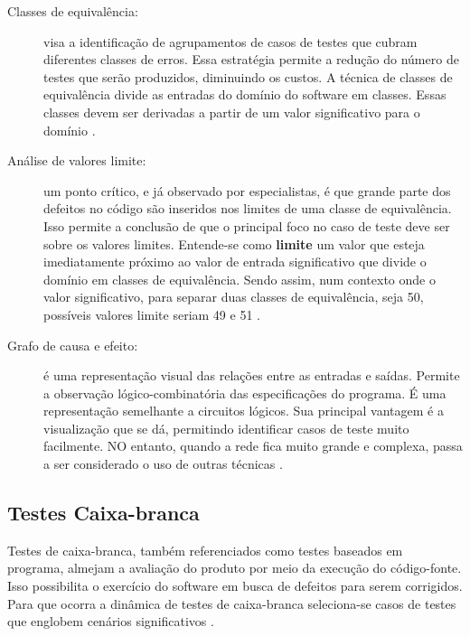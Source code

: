 \begin{description}
\item[Classes de equivalência:] visa a identificação de agrupamentos de casos de testes que cubram diferentes classes de erros. Essa estratégia permite a redução do número de testes que serão produzidos, diminuindo os custos. A técnica de classes de equivalência divide as entradas do domínio do software em classes. Essas classes devem ser derivadas a partir de um valor significativo para o domínio \cite{williams_2006}.
\item[Análise de valores limite:] um ponto crítico, e já observado por especialistas, é que grande parte dos defeitos no código são inseridos nos limites de uma classe de equivalência. Isso permite a conclusão de que o principal foco no caso de teste deve ser sobre os valores limites. Entende-se como \textbf{limite} um valor que esteja imediatamente próximo ao valor de entrada significativo que divide o domínio em classes de equivalência. Sendo assim, num contexto onde o valor significativo, para separar duas classes de equivalência, seja 50, possíveis valores limite seriam 49 e 51 \cite{williams_2006}.
\item[Grafo de causa e efeito:] é uma representação visual das relações entre as entradas e saídas. Permite a observação lógico-combinatória das especificações do programa. É uma representação semelhante a circuitos lógicos. Sua principal vantagem é a visualização que se dá, permitindo identificar casos de teste muito facilmente. NO entanto, quando a rede fica muito grande e complexa, passa a ser considerado o uso de outras técnicas \cite{barbosa_et_al_2009}.
\end{description}


\subsection{Testes Caixa-branca}
Testes de caixa-branca, também referenciados como testes baseados em programa, almejam a avaliação do produto por meio da execução do código-fonte. Isso possibilita o exercício do software em busca de defeitos para serem corrigidos. Para que ocorra a dinâmica de testes de caixa-branca seleciona-se casos de testes que englobem cenários significativos \cite{barbosa_et_al_2009}.


